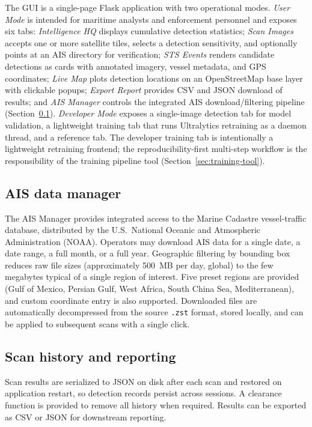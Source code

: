 \documentclass[10pt, letterpaper, twocolumn]{article}
\begin{document}
The GUI is a single-page Flask application with two operational modes. \emph{User Mode} is intended for maritime analysts and enforcement personnel and exposes six tabs: \textit{Intelligence HQ} displays cumulative detection statistics; \textit{Scan Images} accepts one or more satellite tiles, selects a detection sensitivity, and optionally points at an AIS directory for verification; \textit{STS Events} renders candidate detections as cards with annotated imagery, vessel metadata, and GPS coordinates; \textit{Live Map} plots detection locations on an OpenStreetMap base layer with clickable popups; \textit{Export Report} provides CSV and JSON download of results; and \textit{AIS Manager} controls the integrated AIS download/filtering pipeline (Section~\ref{sec:ais-manager}). \emph{Developer Mode} exposes a single-image detection tab for model validation, a lightweight training tab that runs Ultralytics retraining as a daemon thread, and a reference tab. The developer training tab is intentionally a lightweight retraining frontend; the reproducibility-first multi-step workflow is the responsibility of the training pipeline tool (Section~\ref{sec:training-tool}).

\subsection{AIS data manager}
\label{sec:ais-manager}

The AIS Manager provides integrated access to the Marine Cadastre vessel-traffic database, distributed by the U.S.\ National Oceanic and Atmospheric Administration (NOAA). Operators may download AIS data for a single date, a date range, a full month, or a full year. Geographic filtering by bounding box reduces raw file sizes (approximately 500~MB per day, global) to the few megabytes typical of a single region of interest. Five preset regions are provided (Gulf of Mexico, Persian Gulf, West Africa, South China Sea, Mediterranean), and custom coordinate entry is also supported. Downloaded files are automatically decompressed from the source \texttt{.zst} format, stored locally, and can be applied to subsequent scans with a single click.

\subsection{Scan history and reporting}

Scan results are serialized to JSON on disk after each scan and restored on application restart, so detection records persist across sessions. A clearance function is provided to remove all history when required. Results can be exported as CSV or JSON for downstream reporting.
\end{document}
